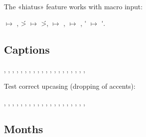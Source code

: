 \documentclass[a4paper]{article}
\begin{document}
The «hiatus» feature works with macro input:

\acctonos\textalpha\textupsilon\textlambda\textomicron\textfinalsigma{}
$\mapsto$
\MakeUppercase{\acctonos\textalpha\textupsilon\textlambda\textomicron\textfinalsigma},
\'>\textalpha\textupsilon\textlambda\textomicron\textfinalsigma{} $\mapsto$
\MakeUppercase{\'>\textalpha\textupsilon\textlambda\textomicron\textfinalsigma},
\textmu\acctonos\textalpha\textiota\textnu\textalpha{} $\mapsto$
\MakeUppercase{\textmu\acctonos\textalpha\textiota\textnu\textalpha},
\textkappa\acctonos\textepsilon\textiota\textkappa $\mapsto$
\MakeUppercase{\textkappa\acctonos\textepsilon\textiota\textkappa},
\accpsili\textalpha\textupsilon\textpi\textnu\'\textiota\textalpha{} $\mapsto$
\MakeUppercase{\accpsili\textalpha\textupsilon\textpi\textnu\'\textiota\textalpha}.

\subsection{Captions}

\prefacename,
\refname,
\abstractname,
\bibname,
\chaptername,
\appendixname,
\contentsname,
\listfigurename ,
\listtablename,
\indexname,
\figurename,
\tablename,
\partname,
\enclname,
\ccname,
\headtoname,
\pagename,
\seename,
\alsoname,
\proofname,
\glossaryname
{}

Test correct upcasing (dropping of accents):

\MakeUppercase{
\prefacename,
\refname,
\abstractname,
\bibname,
\chaptername,
\appendixname,
\contentsname,
\listfigurename,
\listtablename,
\indexname,
\figurename,
\tablename,
\partname,
\enclname,
\ccname,
\headtoname,
\pagename,
\seename,
\alsoname,
\proofname,
\glossaryname
}


\subsection{Months}
\end{document}
